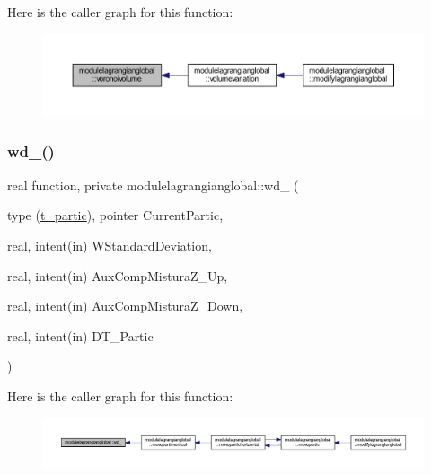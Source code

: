 Here is the caller graph for this function\+:\nopagebreak
\begin{figure}[H]
\begin{center}
\leavevmode
\includegraphics[width=350pt]{namespacemodulelagrangianglobal_a302b214901c2710b5755117530d28d20_icgraph}
\end{center}
\end{figure}
\mbox{\label{namespacemodulelagrangianglobal_a89664f3ed8eeda5bbe36dc80afc53a89}} 
\subsubsection{\texorpdfstring{wd\+\_\+()}{wd\_()}}
{\footnotesize\ttfamily real function, private modulelagrangianglobal\+::wd\+\_\+ (\begin{DoxyParamCaption}\item[{type (\mbox{\hyperlink{structmodulelagrangianglobal_1_1t__partic}{t\+\_\+partic}}), pointer}]{Current\+Partic,  }\item[{real, intent(in)}]{W\+Standard\+Deviation,  }\item[{real, intent(in)}]{Aux\+Comp\+Mistura\+Z\+\_\+\+Up,  }\item[{real, intent(in)}]{Aux\+Comp\+Mistura\+Z\+\_\+\+Down,  }\item[{real, intent(in)}]{D\+T\+\_\+\+Partic }\end{DoxyParamCaption})\hspace{0.3cm}{\ttfamily [private]}}

Here is the caller graph for this function\+:\nopagebreak
\begin{figure}[H]
\begin{center}
\leavevmode
\includegraphics[width=350pt]{namespacemodulelagrangianglobal_a89664f3ed8eeda5bbe36dc80afc53a89_icgraph}
\end{center}
\end{figure}
\mbox{\label{namespacemodulelagrangianglobal_a69e5b3c9a0aabddfcaaf7e1b76623286}} 

